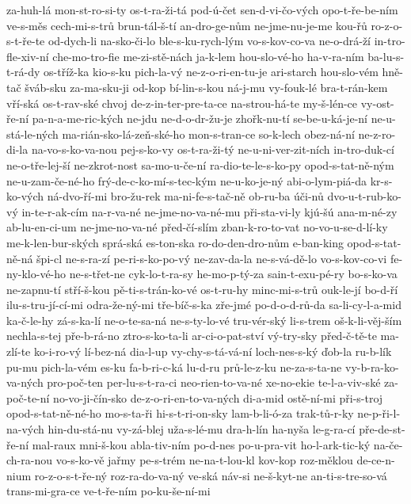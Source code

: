{za-huh-lá
mon-st-ro-si-ty
os-t-ra-ži-tá
pod-ú-čet
sen-d-vi-čo-vých
opo-t-ře-be-ním
ve-s-měs
cech-mi-s-trů
brun-tál-š-tí
an-dro-ge-nům
ne-jme-nu-je-me
kou-řů
ro-z-o-s-t-ře-te
od-dych-li
na-sko-či-lo
ble-s-ku-rych-lým
vo-s-kov-co-va
ne-o-drá-ží
in-tro-fle-xiv-ní
che-mo-tro-fie
me-zi-stě-nách
ja-k-lem
hou-slo-vé-ho
ha-v-ra-ním
ba-lu-s-t-rá-dy
os-tříž-ka
kio-s-ku
pich-la-vý
ne-z-o-ri-en-tu-je
ari-starch
hou-slo-vém
hně-tač
šváb-sku
za-ma-sku-ji
od-kop
bí-lin-s-kou
ná-j-mu
vy-fouk-lé
bra-t-rán-kem
vří-ská
os-t-rav-ské
chvoj
de-z-in-ter-pre-ta-ce
na-strou-há-te
my-š-lén-ce
vy-ost-ře-ní
pa-n-a-me-ric-kých
ne-jdu
ne-d-o-dr-žu-je
zhořk-nu-tí
se-be-u-ká-je-ní
ne-u-stá-le-ných
ma-rián-sko-lá-zeň-ské-ho
mon-s-tran-ce
so-k-lech
obez-ná-ní
ne-z-ro-di-la
na-vo-s-ko-va-nou
pej-s-ko-vy
os-t-ra-ži-tý
ne-u-ni-ver-zit-ních
in-tro-duk-cí
ne-o-tře-lej-ší
ne-zkrot-nost
sa-mo-u-če-ní
ra-dio-te-le-s-ko-py
opod-s-tat-ně-ným
ne-u-zam-če-né-ho
frý-de-c-ko-mí-s-tec-kým
ne-u-ko-je-ný
abi-o-lym-piá-da
kr-s-ko-vých
ná-dvo-ří-mi
bro-žu-rek
ma-ni-fe-s-tač-ně
ob-ru-ba
úči-nů
dvo-u-t-rub-ko-vý
in-te-r-ak-cím
na-r-va-né
ne-jme-no-va-né-mu
při-sta-vi-ly
kjú-šú
ana-m-né-zy
ab-lu-en-ci-um
ne-jme-no-va-né
před-čí-slím
zban-k-ro-to-vat
no-vo-u-se-d-lí-ky
me-k-len-bur-ských
sprá-ská
es-ton-ska
ro-do-den-dro-nům
e-ban-king
opod-s-tat-ně-ná
špi-cl
ne-s-ra-zí
pe-ri-s-ko-po-vý
ne-zav-da-la
ne-s-vá-dě-lo
vo-s-kov-co-vi
fe-ny-klo-vé-ho
ne-s-třet-ne
cyk-lo-t-ra-sy
he-mo-p-tý-za
sain-t-exu-pé-ry
bo-s-ko-va
ne-zapnu-tí
stří-š-kou
pě-ti-s-trán-ko-vé
os-t-ru-hy
minc-mi-s-trů
ouk-le-jí
bo-d-ří
ilu-s-tru-jí-cí-mi
odra-že-ný-mi
tře-bíč-s-ka
zře-jmé
po-d-o-d-rů-da
sa-li-cy-l-a-mid
ka-č-le-hy
zá-s-ka-lí
ne-o-te-sa-ná
ne-s-ty-lo-vé
tru-vér-ský
li-s-trem
oš-k-li-věj-ším
nechla-s-tej
pře-b-rá-no
ztro-s-ko-ta-li
ar-ci-o-pat-ství
vý-try-sky
před-č-tě-te
ma-zlí-te
ko-i-ro-vý
lí-bez-ná
dia-l-up
vy-chy-s-tá-vá-ní
loch-nes-s-ký
ďob-la
ru-b-lík
pu-mu
pich-la-vém
es-ku
fa-b-ri-c-ká
lu-d-ru
prů-le-z-ku
ne-za-s-ta-ne
vy-b-ra-ko-va-ných
pro-poč-ten
per-lu-s-t-ra-ci
neo-rien-to-va-né
xe-no-ekie
te-l-a-viv-ské
za-poč-te-ní
no-vo-ji-čín-sko
de-z-o-ri-en-to-va-ných
di-a-mid
ostě-ní-mi
při-s-troj
opod-s-tat-ně-né-ho
mo-s-ta-ři
hi-s-t-ri-on-sky
lam-b-li-ó-za
trak-tů-r-ky
ne-p-ři-l-na-vých
hin-du-stá-nu
vy-zá-blej
uža-s-lé-mu
dra-h-lín
ha-nyša
le-g-ra-cí
pře-de-st-ře-ní
mal-raux
mni-š-kou
abla-tiv-ním
po-d-nes
po-u-pra-vit
ho-l-ark-tic-ký
na-če-ch-ra-nou
vo-s-ko-vě
jařmy
pe-s-trém
ne-na-t-lou-kl
kov-kop
roz-měklou
de-ce-n-nium
ro-z-o-s-t-ře-ný
roz-ra-do-va-ný
ve-ská
náv-si
ne-š-kyt-ne
an-ti-s-tre-so-vá
trans-mi-gra-ce
ve-t-ře-ním
po-ku-še-ní-mi
}
